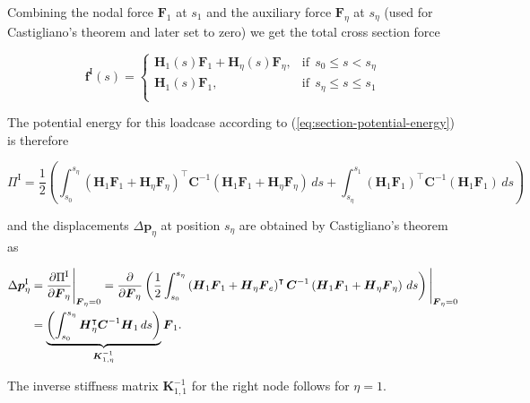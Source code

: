 Combining the nodal force $\boldsymbol{F}_1$ at $s_1$ and the auxiliary force $\boldsymbol{F}_\eta$ at $s_\eta$ (used for Castigliano's theorem and later set to zero) we get the total cross section force

\begin{equation}
\boldsymbol{f}^{\mathrm{I}}(s) = \begin{cases}
\boldsymbol{H}_{1}(s)\boldsymbol{F}_1 + \boldsymbol{H}_{\eta}(s)\boldsymbol{F}_\eta, & \text{if}\ \ s_0 \le s < s_\eta \\
\boldsymbol{H}_{1}(s)\boldsymbol{F}_1, & \text{if}\ \ s_\eta \le s \le s_1 \\
\end{cases}
\end{equation}

The potential energy for this loadcase according to (\ref{eq:section-potential-energy}) is therefore

\begin{equation}
\Pi^{\mathrm{I}} = \frac{1}{2}\left(\int_{s_0}^{s_\eta} \left(\boldsymbol{H}_{1}\boldsymbol{F}_1 + \boldsymbol{H}_{\eta}\boldsymbol{F}_\eta\right)^\intercal\boldsymbol{C}^{-1}\left(\boldsymbol{H}_{1}\boldsymbol{F}_1 + \boldsymbol{H}_{\eta}\boldsymbol{F}_\eta\right)\,ds + \int_{s_\eta}^{s_1} \left(\boldsymbol{H}_{1}\boldsymbol{F}_1\right)^\intercal\boldsymbol{C}^{-1}\left(\boldsymbol{H}_{1}\boldsymbol{F}_1\right)\,ds\right)
\end{equation}

and the displacements $\Delta\boldsymbol{p}_\eta$ at position $s_\eta$ are obtained by Castigliano's theorem as

\begin{align}
\Delta\boldsymbol{p}^{\mathrm{I}}_\eta &= \frac{\partial \Pi^{\mathrm{I}}}{\partial \boldsymbol{F}_\eta}\Bigg|_{\boldsymbol{F}_\eta = 0} = \frac{\partial}{\partial \boldsymbol{F}_\eta}\left(\frac{1}{2}\int_{s_0}^{s_\eta} \left(\boldsymbol{H}_{1}\boldsymbol{F}_1 + \boldsymbol{H}_{\eta}\boldsymbol{F}_e\right)^\intercal\boldsymbol{C}^{-1}\left(\boldsymbol{H}_{1}\boldsymbol{F}_1 + \boldsymbol{H}_{\eta}\boldsymbol{F}_\eta\right)\,ds\right)\Bigg|_{\boldsymbol{F}_\eta = 0} \notag \\
&= \underbrace{\left(\int_{s_0}^{s_\eta} \boldsymbol{H}_\eta^\intercal\boldsymbol{C}^{-1}\boldsymbol{H}_1\,ds\right)}_{\boldsymbol{K}^{-1}_{1,\eta}}\boldsymbol{F}_1.
\end{align}

The inverse stiffness matrix $\boldsymbol{K}^{-1}_{1,1}$ for the right node follows for $\eta = 1$.

